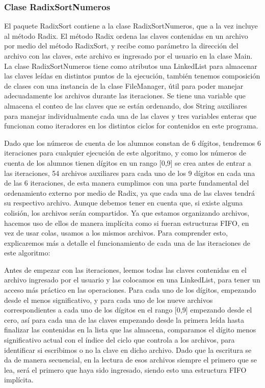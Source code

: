 \documentclass[11pt]{article}
\begin{document}
\subsubsection{Clase RadixSortNumeros}
\par
El paquete RadixSort contiene a la clase RadixSortNumeros, que a la vez incluye al método Radix. El método Radix ordena las claves contenidas en un archivo por medio del método RadixSort, y recibe como parámetro la dirección del archivo con las claves, este archivo es ingresado por el usuario en la clase Main. La clase RadixSortNumeros tiene como atributos una LinkedList para almacenar las claves leídas en distintos puntos de la ejecución, también tenemos composición de clases con una instancia de la clase FileManager, útil para poder manejar adecuadamente los archivos durante las iteraciones. Se tiene una variable que almacena el conteo de las claves que se están ordenando, dos String auxiliares para manejar individualmente cada una de las claves y tres variables enteras que funcionan como iteradores en los distintos ciclos for contenidos en este programa.
\par
Dado que los números de cuenta de los alumnos constan de 6 dígitos, tendremos 6 iteraciones para cualquier ejecución de este algoritmo, y como los números de cuenta de los alumnos tienen dígitos en un rango [0,9] se crea antes de entrar a las iteraciones, 54 archivos auxiliares para cada uno de los 9 dígitos en cada una de las 6 iteraciones, de esta manera cumplimos con una parte fundamental del ordenamiento externo por medio de Radix, ya que cada una de las claves tendrá su respectivo archivo. Aunque debemos tener en cuenta que, si existe alguna colisión, los archivos serán compartidos.
Ya que estamos organizando archivos, hacemos uso de ellos de manera implícita como si fueran estructuras FIFO, en vez de usar colas, usamos a los mismos archivos. Para comprender esto, explicaremos más a detalle el funcionamiento de cada una de las iteraciones de este algoritmo:
\par
Antes de empezar con las iteraciones, leemos todas las claves contenidas en el archivo ingresado por el usuario y las colocamos en una LinkedList, para tener un acceso más práctico en las operaciones.
Para cada uno de los dígitos, empezando desde el menos significativo, y para cada uno de los nueve archivos correspondientes a cada uno de los dígitos en el rango [0,9] empezando desde el cero, así para cada una de las claves empezando desde la primera leída hasta finalizar las contenidas en la lista que las almacena, comparamos el dígito menos significativo actual con el índice del ciclo que controla a los archivos, para identificar si escribimos o no la clave en dicho archivo. Dado que la escritura se da de manera secuencial, en la lectura de esos archivos siempre el primero que se lea, será el primero que haya sido ingresado, siendo esto una estructura FIFO implícita.
\end{document}

